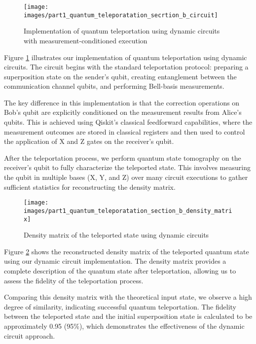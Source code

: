 \documentclass[12pt,a4paper]{article}
\begin{document}
\begin{figure}[h]
\centering
\texttt{[image: images/part1\_quantum\_teleporatation\_secrtion\_b\_circuit]}
\caption{Implementation of quantum teleportation using dynamic circuits with measurement-conditioned execution}
\label{fig:teleportation_dynamic_circuit}
\end{figure}

Figure \ref{fig:teleportation_dynamic_circuit} illustrates our implementation of quantum teleportation using dynamic circuits. The circuit begins with the standard teleportation protocol: preparing a superposition state on the sender's qubit, creating entanglement between the communication channel qubits, and performing Bell-basis measurements.

The key difference in this implementation is that the correction operations on Bob's qubit are explicitly conditioned on the measurement results from Alice's qubits. This is achieved using Qiskit's classical feedforward capabilities, where the measurement outcomes are stored in classical registers and then used to control the application of X and Z gates on the receiver's qubit.

After the teleportation process, we perform quantum state tomography on the receiver's qubit to fully characterize the teleported state. This involves measuring the qubit in multiple bases (X, Y, and Z) over many circuit executions to gather sufficient statistics for reconstructing the density matrix.

\begin{figure}[h]
\centering
\texttt{[image: images/part1\_quantum\_teleporatation\_section\_b\_density\_matrix]}
\caption{Density matrix of the teleported state using dynamic circuits}
\label{fig:teleportation_dynamic_density_matrix}
\end{figure}

Figure \ref{fig:teleportation_dynamic_density_matrix} shows the reconstructed density matrix of the teleported quantum state using our dynamic circuit implementation. The density matrix provides a complete description of the quantum state after teleportation, allowing us to assess the fidelity of the teleportation process.

Comparing this density matrix with the theoretical input state, we observe a high degree of similarity, indicating successful quantum teleportation. The fidelity between the teleported state and the initial superposition state is calculated to be approximately 0.95 (95\%), which demonstrates the effectiveness of the dynamic circuit approach.
\end{document}
